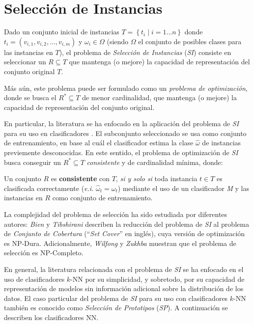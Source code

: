 \section{Selección de Instancias}

Dado un conjunto inicial de instancias $T = \left\{ t_i \mid i = 1 \dots n \right\}$ donde\linebreak $t_i = (v_{i,1}, v_{i,2}, \dots, v_{i,m})$ y $\omega_i \in \Omega$ (siendo $\Omega$ el conjunto de posibles clases para las instancias en $T$), el problema de \emph{Selección de Instancias} (\emph{SI}) consiste en seleccionar un $R \subseteq T$ que mantenga (o mejore) la capacidad de representación del conjunto original $T$.

Más aún, este problema puede ser formulado como un \emph{problema de optimización}, donde se busca el $R^* \subseteq T$ de menor cardinalidad, que mantenga (o mejore) la capacidad de representación del conjunto original.

En particular, la literatura se ha enfocado en la aplicación del problema de \emph{SI} para su uso en clasificadores \cite{DBLP:journals/corr/GottliebK14,DBLP:conf/jcdcg/Toussaint02}. El subconjunto seleccionado se usa como conjunto de entrenamiento, en base al cuál el clasificador estima la clase $\hat{\omega}$ de instancias previemente desconocidas. En este sentido, el problema de optimización de \emph{SI} busca conseguir un $R^* \subseteq T$ \emph{consistente} y de cardinalidad mínima, donde:

\begin{definicion}
Un conjunto $R$ es \textbf{consistente} con $T$, \emph{si y solo si} toda instancia $t \in T$ es clasificada correctamente (\emph{e.i.} $\hat{\omega}_t = \omega_t$) mediante el uso de un clasificador \emph{M} y las instancias en $R$ como conjunto de entrenamiento.
\end{definicion}

La complejidad del problema de selección ha sido estudiada por diferentes autores: \emph{Bien} y \emph{Tibshirani} \cite{2012arXiv1202.5933B} describen la reducción del problema de \emph{SI} al problema de \emph{Conjunto de Cobertura} (``\emph{Set Cover}'' en inglés), cuya versión de optimización es NP-Dura. Adicionalmente, \emph{Wilfong} \cite{Wilfong:1991:NNP:109648.109673} y  \emph{Zukhba} \cite{Zukhba:2010:NPP:1921730.1921735} muestran que el problema de selección es {\color{red}NP-Completo}.

En general, la literatura relacionada con el problema de \emph{SI} se ha enfocado en el uso de clasificadores $k$-NN por su simplicidad, y sobretodo, por su capacidad de representación de modelos sin información adicional sobre la distribución de los datos. El caso particular del problema de \emph{SI} para su uso con clasificadores $k$-NN también es conocido como \emph{Selección de Prototipos} (\emph{SP}). A continuación se describen los clasificadores NN.

